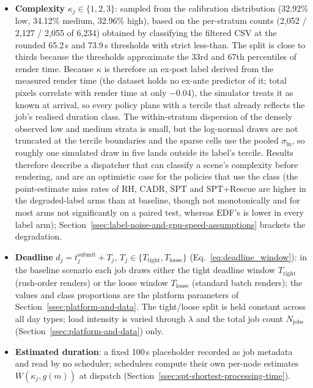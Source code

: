 \begin{itemize}
  \item \textbf{Complexity} $\kappa_j \in \{1, 2, 3\}$: sampled from the calibration distribution (32.92\% low, 34.12\% medium, 32.96\% high), based on the per-stratum counts (2,052 / 2,127 / 2,055 of 6,234) obtained by classifying the filtered CSV at the rounded 65.2\,s and 73.9\,s thresholds with strict less-than. The split is close to thirds because the thresholds approximate the 33rd and 67th percentiles of render time. Because $\kappa$ is therefore an ex-post label derived from the measured render time (the dataset holds no ex-ante predictor of it; total pixels correlate with render time at only $-0.04$), the simulator treats it as known at arrival, so every policy plans with a tercile that already reflects the job's realised duration class. The within-stratum dispersion of the densely observed low and medium strata is small, but the log-normal draws are not truncated at the tercile boundaries and the sparse cells use the pooled $\sigma_{\ln}$, so roughly one simulated draw in five lands outside its label's tercile. Results therefore describe a dispatcher that can classify a scene's complexity before rendering, and are an optimistic case for the policies that use the class (the point-estimate miss rates of RH, CADR, SPT and SPT+Rescue are higher in the degraded-label arms than at baseline, though not monotonically and for most arms not significantly on a paired test, whereas EDF's is lower in every label arm); Section~\ref{ssec:label-noise-and-gpu-speed-assumptions} brackets the degradation.
  \item \textbf{Deadline} $d_j = t_j^{\text{submit}} + T_j$, $T_j \in \{T_{\text{tight}}, T_{\text{loose}}\}$ (Eq.~\ref{eq:deadline_window}): in the baseline scenario each job draws either the tight deadline window $T_{\text{tight}}$ (rush-order renders) or the loose window $T_{\text{loose}}$ (standard batch renders); the values and class proportions are the platform parameters of Section~\ref{ssec:platform-and-data}. The tight/loose split is held constant across all day types; load intensity is varied through $\lambda$ and the total job count $N_{\text{jobs}}$ (Section~\ref{ssec:platform-and-data}) only.
  \item \textbf{Estimated duration}: a fixed 100\,s placeholder recorded as job metadata and read by no scheduler; schedulers compute their own per-node estimates $\overline{W}(\kappa_j, g(m))$ at dispatch (Section~\ref{ssec:spt-shortest-processing-time}).
\end{itemize}

